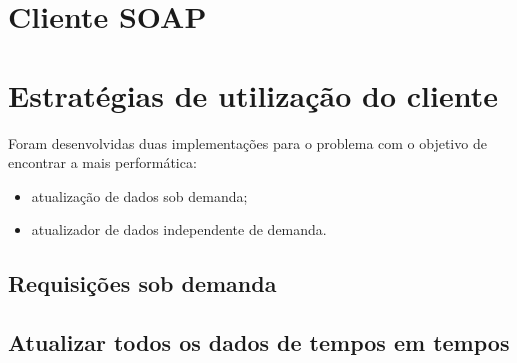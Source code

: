 \label{Cap:implementacao}

\section{Cliente SOAP}

\section{Estratégias de utilização do cliente}

Foram desenvolvidas duas implementações para o problema com o objetivo de encontrar a mais performática:

\begin{itemize}
\item atualização de dados sob demanda;
\item atualizador de dados independente de demanda.
\end{itemize}

\subsection{Requisições sob demanda}



\subsection{Atualizar todos os dados de tempos em tempos}

